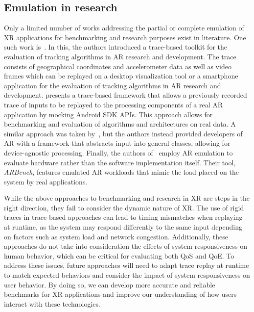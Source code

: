 
%

\subsection{Emulation in  research}

Only a limited number of works addressing the partial or complete emulation of XR applications for benchmarking and research purposes exist in literature.
One such work is~\cite{williams2013transform}.
In this, the authors introduced a trace-based toolkit for the evaluation of tracking algorithms in \gls{AR} research and development.
The trace consists of geographical coordinates and accelerometer data as well as video frames which can be replayed on a desktop visualization tool or a smartphone application for the evaluation of tracking algorithms in \gls{AR} research and development.\@
\cite{munro2016aaremu} presents a trace-based framework that allows a previously recorded trace of inputs to be replayed to the processing components of a real \gls{AR} application by mocking Android \gls{SDK} \glspl{API}.
This approach allows for benchmarking and evaluation of algorithms and architectures on real data.
A similar approach was taken by~\cite{choi2022emulating}, but the authors instead provided developers of \gls{AR} with a framework that abstracts input into general classes, allowing for device-agnostic processing.
Finally, the authors of~\cite{chetoui2022arbench} employ \gls{AR} emulation to evaluate hardware rather than the software implementation itself.
Their tool, \emph{ARBench}, features emulated \gls{AR} workloads that mimic the load placed on the system by real applications.

While the above approaches to benchmarking and research in \gls{XR} are steps in the right direction, they fail to consider the dynamic nature of \gls{XR}.
The use of rigid traces in trace-based approaches can lead to timing mismatches when replaying at runtime, as the system may respond differently to the same input depending on factors such as system load and network congestion.
Additionally, these approaches do not take into consideration the effects of system responsiveness on human behavior, which can be critical for evaluating both \gls{QoS} and \gls{QoE}.
To address these issues, future approaches will need to adapt trace replay at runtime to match expected behaviors and consider the impact of system responsiveness on user behavior.
By doing so, we can develop more accurate and reliable benchmarks for \gls{XR} applications and improve our understanding of how users interact with these technologies.

